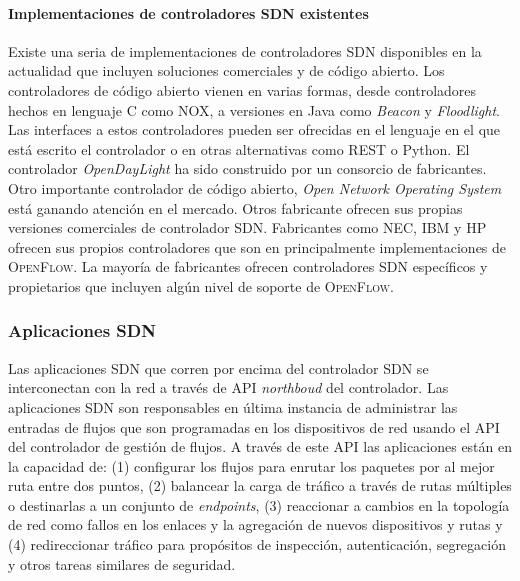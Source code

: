 \documentclass[10pt,journal,compsoc]{IEEEtran}
\begin{document}
\paragraph{Implementaciones de controladores SDN existentes}
Existe una seria de implementaciones de controladores SDN disponibles en la actualidad que incluyen soluciones comerciales y de código abierto. Los controladores de código abierto vienen en varias formas, desde controladores hechos en lenguaje C como NOX, a versiones en Java como \emph{Beacon} y \emph{Floodlight}. Las interfaces a estos controladores pueden ser ofrecidas en el lenguaje en el que está escrito el controlador o en otras alternativas como REST o Python. El controlador \emph{OpenDayLight} ha sido construido por un consorcio de fabricantes. Otro importante controlador de código abierto, \emph{Open Network Operating System} está ganando atención en el mercado. Otros fabricante ofrecen sus propias versiones comerciales de controlador SDN. Fabricantes como NEC, IBM y HP ofrecen sus propios controladores que son en principalmente implementaciones de \textsc{OpenFlow}. La mayoría de fabricantes ofrecen controladores SDN específicos y propietarios que incluyen algún nivel de soporte de \textsc{OpenFlow}.

\subsubsection{Aplicaciones SDN}
Las aplicaciones SDN que corren por encima del controlador SDN se interconectan con la red a través de API \emph{northboud} del controlador. Las aplicaciones SDN son responsables en última instancia de administrar las entradas de flujos que son programadas en los dispositivos de red usando el API del controlador de gestión de flujos. A través de este API las aplicaciones están en la capacidad de: (1) configurar los flujos para enrutar los paquetes por al mejor ruta entre dos puntos, (2) balancear la carga de tráfico a través de rutas múltiples o destinarlas a un conjunto de \emph{endpoints}, (3) reaccionar a cambios en la topología de red como fallos en los enlaces y la agregación de nuevos dispositivos y rutas y (4) redireccionar tráfico para propósitos de inspección, autenticación, segregación y otros tareas similares de seguridad.
\end{document}
